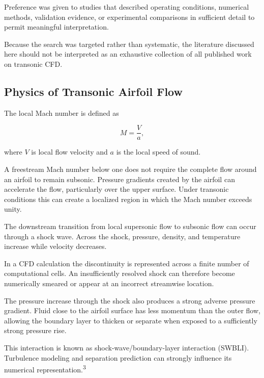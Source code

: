 \documentclass[10pt]{article}
\newcommand{\supercite}[1]{\textsuperscript{#1}}
\begin{document}
Preference was given to studies that described operating conditions,
numerical methods, validation evidence, or experimental comparisons in
sufficient detail to permit meaningful interpretation.

Because the search was targeted rather than systematic, the literature
discussed here should not be interpreted as an exhaustive collection of
all published work on transonic CFD.


\subsection{Physics of Transonic Airfoil Flow}

The local Mach number is defined as

\begin{equation}
M=\frac{V}{a},
\end{equation}

where $V$ is local flow velocity and $a$ is the local speed of sound.

A freestream Mach number below one does not require the complete flow
around an airfoil to remain subsonic. Pressure gradients created by the
airfoil can accelerate the flow, particularly over the upper surface.
Under transonic conditions this can create a localized region in which
the Mach number exceeds unity.

The downstream transition from local supersonic flow to subsonic flow
can occur through a shock wave. Across the shock, pressure, density, and
temperature increase while velocity decreases.

In a CFD calculation the discontinuity is represented across a finite
number of computational cells. An insufficiently resolved shock can
therefore become numerically smeared or appear at an incorrect
streamwise location.

The pressure increase through the shock also produces a strong adverse
pressure gradient. Fluid close to the airfoil surface has less momentum
than the outer flow, allowing the boundary layer to thicken or separate
when exposed to a sufficiently strong pressure rise.

This interaction is known as shock-wave/boundary-layer interaction
(SWBLI). Turbulence modeling and separation prediction can strongly
influence its numerical representation.\supercite{3}
\end{document}

